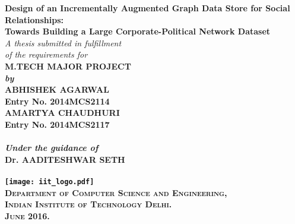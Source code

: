 \begin{titlepage}
\begin{center}

\LARGE{\textsf{\bfseries Design of an Incrementally Augmented Graph Data Store for Social Relationships:}}\\
\LARGE{\textsf{\bfseries Towards Building a Large Corporate-Political Network Dataset}}\\
\vspace{20pt}
\normalsize
\emph{A thesis submitted in fulfillment} \\
\emph{of the requirements for} \\
\vspace{10pt}
\bfseries M.TECH MAJOR PROJECT \\
\emph {by}\\
\vspace{10pt}
\Large{\textsf{\bfseries ABHISHEK AGARWAL}} \\
{\normalsize \textsf{\bfseries Entry No. 2014MCS2114}}\\
\Large{\textsf{\bfseries AMARTYA CHAUDHURI}} \\
{\normalsize \textsf{\bfseries Entry No. 2014MCS2117}}\\

\ \\
{\normalsize \emph {Under the guidance of}}
\ \\
\Large{\textsf{\bfseries Dr. AADITESHWAR SETH}} \\
\ \\
\vspace{20pt}
\texttt{[image: iit\_logo.pdf]} \\
\vspace{10pt}
\large{\textsc{Department of Computer Science and Engineering,\\
Indian Institute of Technology Delhi.\\ June 2016.}}
\end{center}
\end{titlepage}
